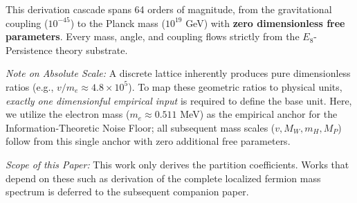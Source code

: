 This derivation cascade spans 64 orders of magnitude, from the gravitational coupling ($10^{-45}$) to the Planck mass ($10^{19}$ GeV) with \textbf{zero dimensionless free parameters}. Every mass, angle, and coupling flows strictly from the $E_8$-Persistence theory substrate.

\textit{Note on Absolute Scale:} A discrete lattice inherently produces pure dimensionless ratios (e.g., $v/m_e \approx 4.8 \times 10^5$). To map these geometric ratios to physical units, \textit{exactly one dimensionful empirical input} is required to define the base unit. Here, we utilize the electron mass ($m_e \approx 0.511$ MeV) as the empirical anchor for the Information-Theoretic Noise Floor; all subsequent mass scales ($v, M_W, m_H, M_P$) follow from this single anchor with zero additional free parameters.

\textit{Scope of this Paper:} This work only derives the partition coefficients. Works that depend on these such as derivation of the complete localized fermion mass spectrum is deferred to the subsequent companion paper.